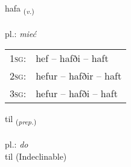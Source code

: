 \documentclass[frontgrid, backgrid]{flacards}\usepackage[]{graphicx}\usepackage[]{xcolor}
\begin{document}
\renewcommand{\blhead}{\vskip5pt {\small\bfseries\footnotesize Sagnorð | czasownik }}
\renewcommand{\bcfoot}{\vskip5pt \hspace{2pt}{\small\bfseries\footnotesize 1K}}


{hafa \small{\textsubscript{(\textit{v.})}} \\[1ex] %
\textphonetic{[haːva]} \\
pl.: \emph{mieć} \\  [2ex]
\renewcommand*{\arraystretch}{0.8}
\begin{tabular}{p{1cm}l}
\textsc{1sg}: & hef -- hafði -- haft \\ 
\textsc{2sg}: & hefur -- hafðir -- haft \\ 
\textsc{3sg}: & hefur -- hafði -- haft \\ 
\end{tabular}
}


\renewcommand{\flhead}{\vskip5pt \fboxsep=0pt {\small\bfseries\footnotesize Forsetning | przyimek}}
\renewcommand{\fcfoot}{\vskip5pt \fboxsep=0pt \hspace{2pt}{\small\bfseries\footnotesize 1K}}

\renewcommand{\blhead}{\vskip5pt {\small\bfseries\footnotesize Forsetning | przyimek }}
\renewcommand{\bcfoot}{\vskip5pt \hspace{2pt}{\small\bfseries\footnotesize 1K}}


{til \small{\textsubscript{(\textit{prep.})}} \\[1ex]
\textphonetic{[tʰɪːl]} \\
pl.: \emph{do} \\  [2ex]
til (Indeclinable)}

\renewcommand{\flhead}{\vskip5pt \fboxsep=0pt {\small\bfseries\footnotesize Fornafn | zaimek}}
\renewcommand{\fcfoot}{\vskip5pt \fboxsep=0pt \hspace{2pt}{\small\bfseries\footnotesize 1K}}

\renewcommand{\blhead}{\vskip5pt {\small\bfseries\footnotesize Fornafn | zaimek }}
\renewcommand{\bcfoot}{\vskip5pt \hspace{2pt}{\small\bfseries\footnotesize 1K}}
\end{document}
